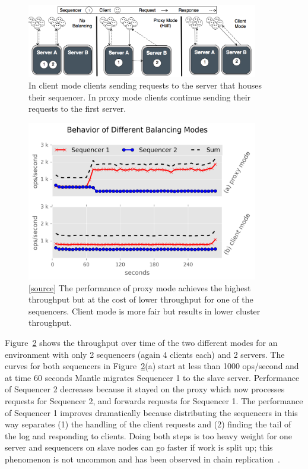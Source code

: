 \begin{figure}[t!]
\centering
\includegraphics[width=0.9\textwidth]{./chapters/controlplane/malacology/figures/mantle-modes.png}
\caption{ In client mode clients sending requests to the server that houses
their sequencer. In proxy mode clients continue sending their requests to the
first server.  }\label{fig:mantle-modes}
\end{figure}

\begin{figure}[tb]
\centering
\includegraphics[width=0.9\textwidth]{./chapters/controlplane/malacology/figures/mantle-mode-behavior.png}
\caption{
[\href{https://github.com/michaelsevilla/malacology-popper/blob/v2.1/experiments/mds-zlog-seq-migrate-redux-waves/results-paper/visualize.ipynb}{source}]
The performance of proxy mode achieves the highest throughput but at the cost
of lower throughput for one of the sequencers. Client mode is more fair but
results in lower cluster throughput.  }\label{fig:mantle-mode-behavior}
\end{figure}

Figure~\ref{fig:mantle-mode-behavior} shows the throughput over time of the two
different modes for an environment with only 2 sequencers (again 4 clients
each) and 2 servers. The curves for both sequencers in
Figure~\ref{fig:mantle-mode-behavior}(a) start at less than 1000 ops/second and
at time 60 seconds Mantle migrates Sequencer 1 to the slave server.
Performance of Sequencer 2 decreases because it stayed on the proxy which now
processes requests for Sequencer 2, and forwards requests for Sequencer 1. The
performance of Sequencer 1 improves dramatically because distributing the
sequencers in this way separates (1) the handling of the client requests and
(2) finding the tail of the log and responding to clients.  Doing both steps is
too heavy weight for one server and sequencers on slave nodes can go faster if
work is split up; this phenomenon is not uncommon and has been observed in
chain replication~\cite{chain_rep}.

